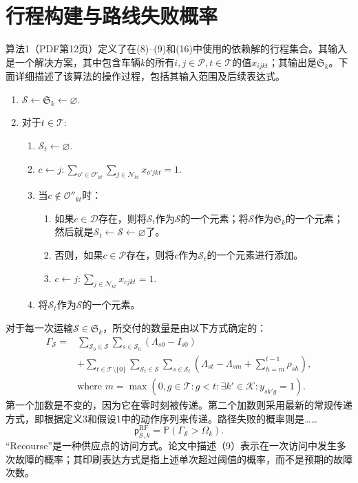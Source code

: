 \documentclass[10pt]{article}
\begin{document}
\section*{行程构建与路线失败概率}
算法1（PDF第12页）定义了在(8)--(9)和(16)中使用的依赖解的行程集合。其输入是一个解决方案，其中包含车辆$k$的所有$i,j\in\mathcal P,t\in\mathcal T$的值$x_{ijkt}$；其输出是$\mathfrak S_k$。下面详细描述了该算法的操作过程，包括其输入范围及后续表达式。
\begin{enumerate}
\item $\mathcal S\leftarrow\mathfrak S_k\leftarrow\varnothing$.
\item 对于$t\in\mathcal T$:
\begin{enumerate}
\item $\mathcal S_t\leftarrow\varnothing$.
\item $c\leftarrow j:\displaystyle\sum_{o'\in\mathcal O'_{kt}}\sum_{j\in\mathcal N_{kt}}x_{o'jkt}=1$.
\item 当$c\notin\mathcal O''_{kt}$时：
\begin{enumerate}
\item 如果$c\in\mathcal D$存在，则将$\mathcal S_t$作为$\mathcal S$的一个元素；将$\mathcal S$作为$\mathfrak S_k$的一个元素；然后就是$\mathcal S_t\leftarrow\mathcal S\leftarrow\varnothing$了。
\item 否则，如果$c\in\mathcal P$存在，则将$c$作为$\mathcal S_t$的一个元素进行添加。
\item $c\leftarrow j:\displaystyle\sum_{j\in\mathcal N_{kt}}x_{cjkt}=1$.
\end{enumerate}
\item 将$\mathcal S_t$作为$\mathcal S$的一个元素。
\end{enumerate}
\end{enumerate}
对于每一次运输$\mathcal S\in\mathfrak S_k$，所交付的数量是由以下方式确定的：
\begin{equation}
\begin{aligned}
\Gamma_{\mathcal S}
={}&\sum_{\mathcal S_0\in\mathcal S}\sum_{s\in\mathcal S_0}(\Lambda_{s0}-I_{s0})\\
&+\sum_{t\in\mathcal T\setminus\{0\}}\sum_{\mathcal S_t\in\mathcal S}\sum_{s\in\mathcal S_t}
\left(\Lambda_{st}-\Lambda_{sm}+\sum_{h=m}^{t-1}\rho_{sh}\right),\\
&\text{where }m=\max(0,g\in\mathcal T:g<t:\exists k'\in\mathcal K:y_{sk'g}=1).
\end{aligned}\tag{8}
\end{equation}
第一个加数是不变的，因为它在零时刻被传递。第二个加数则采用最新的常规传递方式，即根据定义3和假设1中的动作序列来传递。路径失败的概率则是……
\begin{equation}
\mathsf p^{\mathrm{RF}}_{\mathcal S,k}=\mathbb P(\Gamma_{\mathcal S}>\Omega_k).
\tag{9}
\end{equation}
“Recourse”是一种供应点的访问方式。论文中描述（9）表示在一次访问中发生多次故障的概率；其印刷表达方式是指上述单次超过阈值的概率，而不是预期的故障次数。
\end{document}
